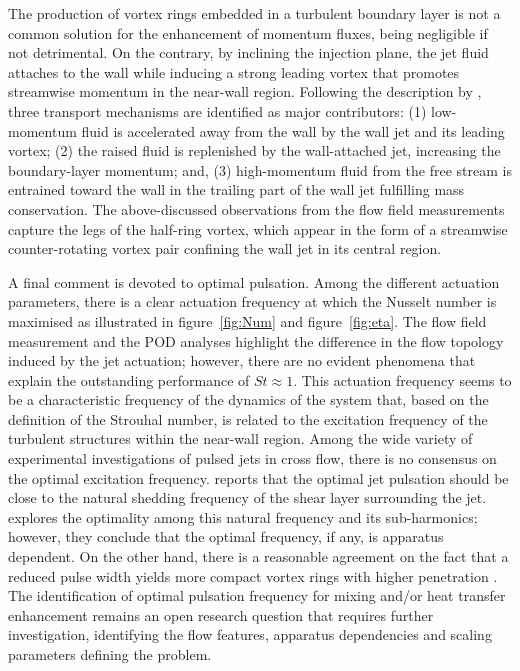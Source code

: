 The production of vortex rings embedded in a turbulent boundary layer is not a common solution for the enhancement of momentum fluxes, being negligible if not detrimental. On the contrary, by inclining the injection plane, the jet fluid attaches to the wall while inducing a strong leading vortex that promotes streamwise momentum in the near-wall region. Following the description by \citet{Steinfurth2021pulsedjet}, three transport mechanisms are identified as major contributors: (1) low-momentum fluid is accelerated away from the wall by the wall jet and its leading vortex; (2) the raised fluid is replenished by the wall-attached jet, increasing the boundary-layer momentum; and, (3) high-momentum fluid from the free stream is entrained toward the wall in the trailing part of the wall jet fulfilling mass conservation. The above-discussed observations from the flow field measurements capture the legs of the half-ring vortex, which appear in the form of a streamwise counter-rotating vortex pair confining the wall jet in its central region.

A final comment is devoted to optimal pulsation. Among the different actuation parameters, there is a clear actuation frequency at which the Nusselt number is maximised as illustrated in figure~\ref{fig:Num} and figure~\ref{fig:eta}. The flow field measurement and the POD analyses highlight the difference in the flow topology induced by the jet actuation; however, there are no evident phenomena that explain the outstanding performance of $St \approx 1$. This actuation frequency seems to be a characteristic frequency of the dynamics of the system that, based on the definition of the Strouhal number, is related to the excitation frequency of the turbulent structures within the near-wall region. Among the wide variety of experimental investigations of pulsed jets in cross flow, there is no consensus on the optimal excitation frequency. \citet{kelso1996experimental} reports that the optimal jet pulsation should be close to the natural shedding frequency of the shear layer surrounding the jet. \citet{MCLOSKEY2002} explores the optimality among this natural frequency and its sub-harmonics; however, they conclude that the optimal frequency, if any, is apparatus dependent. On the other hand, there is a reasonable agreement on the fact that a reduced pulse width yields more compact vortex rings with higher penetration \citep[e.g.][]{kelso1996experimental,johari1999penetration, eroglu2001structure, MCLOSKEY2002, Johari2006scaling}. The identification of optimal pulsation frequency for mixing and/or heat transfer enhancement remains an open research question that requires further investigation, identifying the flow features, apparatus dependencies and scaling parameters defining the problem.

